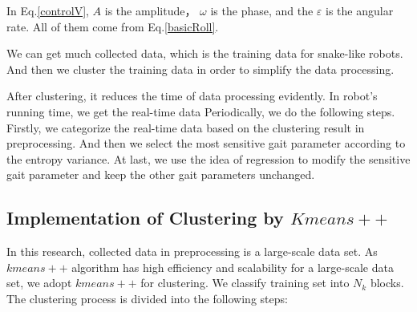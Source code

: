 In Eq.\ref{controlV}, $A$ is the amplitude， $\omega$ is the phase, and the $\varepsilon$ is the angular rate. All of them come from Eq.\ref{basicRoll}.

We can get much collected data, which is the training data for snake-like robots. And then we cluster the training data in order to simplify the data processing.

After clustering, it reduces the time of data processing evidently. In robot's running time, we get the real-time data Periodically, we do the following steps. Firstly, we categorize the real-time data based on the clustering result in preprocessing. And then we select the most sensitive gait parameter according to the entropy variance. At last, we use the idea of regression to modify the sensitive gait parameter and keep the other gait parameters unchanged.

\subsection{Implementation of Clustering by $Kmeans++$}
In this research, collected data in preprocessing is a large-scale data set. As $kmeans++$ algorithm has high efficiency and scalability for a large-scale data set, we adopt $kmeans++$ for clustering. We classify training set into $N_{k}$ blocks. The clustering process is divided into the following steps:

